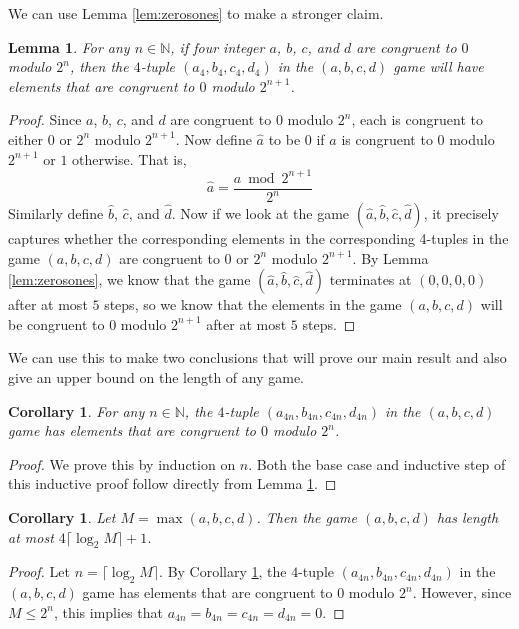 \documentclass[12pt]{amsart}
\newtheorem{corollary}[theorem]{Corollary}
\newtheorem{lemma}[theorem]{Lemma}
\newcommand{\znn}{\mathbb{N}}
\begin{document}
We can use Lemma \ref{lem:zerosones} to make a stronger claim.

\begin{lemma}
For any $n \in \znn$, if four integer $a$, $b$, $c$, and $d$ are congruent to $0$ modulo $2^n$, then the $4$-tuple $(a_4, b_4, c_4, d_4)$ in the $(a,b,c,d)$ game will have elements that are congruent to $0$ modulo $2^{n+1}$.
\label{lem:evenodd}
\end{lemma}

\begin{proof}
Since $a$, $b$, $c$, and $d$ are congruent to $0$ modulo $2^n$, each is congruent to either $0$ or $2^n$ modulo $2^{n+1}$. Now define $\hat{a}$ to be $0$ if $a$ is congruent to $0$ modulo $2^{n+1}$ or $1$ otherwise. That is,
$$
\hat{a} = \frac{a \bmod{2^{n+1}}}{2^n}
$$
Similarly define $\hat{b}$, $\hat{c}$, and $\hat{d}$. Now if we look at the game $(\hat{a},\hat{b},\hat{c},\hat{d})$, it precisely captures whether the corresponding elements in the corresponding 4-tuples in the game $(a,b,c,d)$ are congruent to $0$ or $2^n$ modulo $2^{n+1}$. By Lemma \ref{lem:zerosones}, we know that the game $(\hat{a},\hat{b},\hat{c},\hat{d})$ terminates at $(0,0,0,0)$ after at most $5$ steps, so we know that the elements in the game $(a,b,c,d)$ will be congruent to $0$ modulo $2^{n+1}$ after at most $5$ steps.
\end{proof}

We can use this to make two conclusions that will prove our main result and also give an upper bound on the length of any game.

\begin{corollary}
For any $n \in \znn$, the $4$-tuple $(a_{4n}, b_{4n}, c_{4n}, d_{4n})$ in the $(a,b,c,d)$ game has elements that are congruent to $0$ modulo $2^n$.
\label{cor:pow2}
\end{corollary}

\begin{proof}
We prove this by induction on $n$.
Both the base case and inductive step of this inductive proof follow directly from Lemma \ref{lem:evenodd}.
\end{proof}

\begin{corollary}
Let $M=\max(a,b,c,d)$. Then the game $(a,b,c,d)$ has length at most $4\lceil\log_2{M}\rceil + 1$.
\end{corollary}

\begin{proof}
Let $n = \lceil\log_2{M}\rceil$. By Corollary \ref {cor:pow2}, the $4$-tuple $(a_{4n}, b_{4n}, c_{4n}, d_{4n})$ in the $(a,b,c,d)$ game has elements that are congruent to $0$ modulo $2^n$. However, since $M\leq2^n$, this implies that $a_{4n}=b_{4n}=c_{4n}=d_{4n}=0$.
\end{proof}
\end{document}
